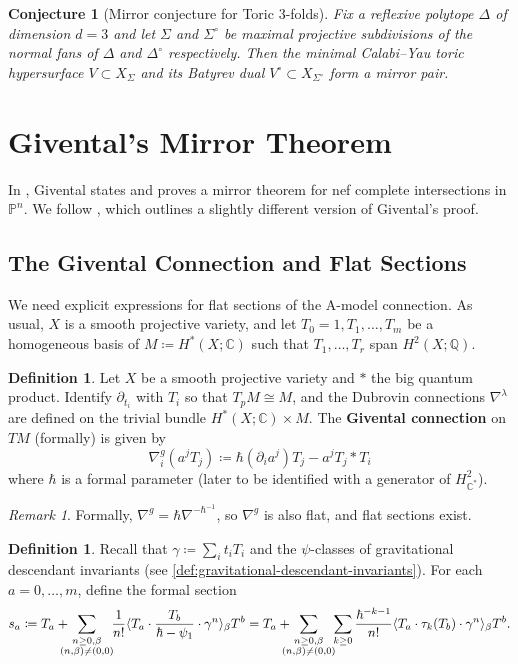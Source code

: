 \documentclass{report}
\theoremstyle{plain}
\newtheorem{conjecture}[theorem]{Conjecture}
\theoremstyle{definition}
\newtheorem{definition}[theorem]{Definition}
\theoremstyle{remark}
\newtheorem*{remark}{Remark}
\newcommand{\di}{\partial}
\newcommand{\bC}{\mathbb{C}}
\newcommand{\bQ}{\mathbb{Q}}
\newcommand{\bP}{\mathbb{P}}
\DeclarePairedDelimiter{\inner}{\langle}{\rangle}
\begin{document}
\begin{conjecture}[Mirror conjecture for Toric $3$-folds]
  Fix a reflexive polytope $\Delta$ of dimension $d = 3$ and let
  $\Sigma$ and $\Sigma^\circ$ be maximal projective subdivisions of
  the normal fans of $\Delta$ and $\Delta^\circ$ respectively. Then
  the minimal Calabi--Yau toric hypersurface $V \subset X_\Sigma$ and
  its Batyrev dual $V^\circ \subset X_{\Sigma^\circ}$ form a mirror
  pair.
\end{conjecture}

\section{Givental's Mirror Theorem}

In \cite{Givental1996}, Givental states and proves a mirror theorem
for nef complete intersections in $\bP^n$. We follow \cite[Section
  11.2]{Cox1999}, which outlines a slightly different version of
Givental's proof.

\subsection{The Givental Connection and Flat Sections}

We need explicit expressions for flat sections of the A-model
connection. As usual, $X$ is a smooth projective variety, and let $T_0
= 1, T_1, \ldots, T_m$ be a homogeneous basis of $M \coloneqq H^*(X;
\bC)$ such that $T_1, \ldots, T_r$ span $H^2(X; \bQ)$.

\begin{definition}
  Let $X$ be a smooth projective variety and $*$ the big quantum
  product. Identify $\di_{t_i}$ with $T_i$ so that $T_pM \cong M$, and
  the Dubrovin connections $\nabla^\lambda$ are defined on the trivial
  bundle $H^*(X; \bC) \times M$. The {\bf Givental connection} on $TM$
  (formally) is given by
  \[ \nabla^g_i(a^j T_j) \coloneqq \hbar (\di_i a^j) T_j - a^j T_j * T_i \]
  where $\hbar$ is a formal parameter (later to be identified with a
  generator of $H^2_{\bC^*}$).
\end{definition}

\begin{remark}
  Formally, $\nabla^g = \hbar \nabla^{-\hbar^{-1}}$, so $\nabla^g$ is
  also flat, and flat sections exist.
\end{remark}

\begin{definition}
  Recall that $\gamma \coloneqq \sum_i t_i T_i$ and the $\psi$-classes
  of gravitational descendant invariants (see
  \ref{def:gravitational-descendant-invariants}). For each $a = 0,
  \ldots, m$, define the formal section
  \[ s_a \coloneqq T_a + \!\!\!\!\!\sum_{\substack{n \ge 0, \beta\\(n,\beta)\neq(0,0)}} \!\!\frac{1}{n!} \inner{T_a \cdot \frac{T_b}{\hbar - \psi_1} \cdot \gamma^n}_\beta T^b = T_a + \!\!\!\!\!\sum_{\substack{n \ge 0, \beta\\(n,\beta)\neq(0,0)}} \!\!\sum_{k \ge 0} \frac{\hbar^{-k-1}}{n!} \inner{T_a \cdot \tau_k(T_b) \cdot \gamma^n}_\beta T^b. \]
\end{definition}
\end{document}
